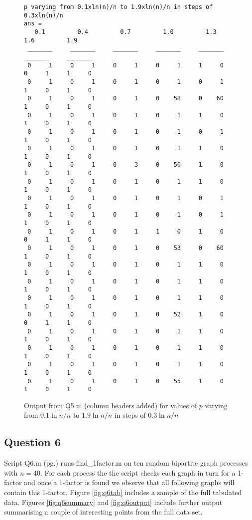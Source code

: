 \documentclass[a4paper]{article}
\begin{document}
\begin{figure}[H]
    \centering
    \begin{verbatim}
p varying from 0.1xln(n)/n to 1.9xln(n)/n in steps of 0.3xln(n)/n
ans =
   0.1         0.4         0.7         1.0         1.3         1.6         1.9    
 _______     _______     _______     _______     _______     _______     _______
 0     1     0     1     0     1     0     1     1     0     0     1     1     0
 0     1     0     1     0     1     0     1     0     1     1     0     1     0
 0     1     0     1     0     1     0    58     0    60     1     0     1     0
 0     1     0     1     0     1     0     1     1     0     1     0     1     0
 0     1     0     1     0     1     0     1     0     1     1     0     1     0
 0     1     0     1     0     1     0     1     1     0     1     0     1     0
 0     1     0     1     0     3     0    50     1     0     1     0     1     0
 0     1     0     1     0     1     0     1     1     0     1     0     1     0
 0     1     0     1     0     1     0     1     0     1     1     0     1     0
 0     1     0     1     0     1     0     1     0     1     1     0     1     0
 0     1     0     1     0     1     1     0     1     0     0     1     1     0
 0     1     0     1     0     1     0    53     0    60     1     0     1     0
 0     1     0     1     0     1     0     1     1     0     1     0     1     0
 0     1     0     1     0     1     0     1     1     0     1     0     1     0
 0     1     0     1     0     1     0     1     1     0     1     0     1     0
 0     1     0     1     0     1     0    52     1     0     0     1     1     0
 0     1     0     1     0     1     0     1     1     0     1     0     1     0
 0     1     0     1     0     1     0     1     1     0     1     0     1     0
 0     1     0     1     0     1     0     1     1     0     1     0     1     0
 0     1     0     1     0     1     0    55     1     0     1     0     1     0
    \end{verbatim}
    \caption{Output from Q5.m (column headers added) for values of $p$ varying from $0.1\ln{n}/n$ to $1.9\ln{n}/n$ in steps of $0.3\ln{n}/n$}
    \label{fig:q5b}
\end{figure}

\subsection*{Question 6}

Script Q6.m (pg.\pageref{PQ6}) runs find\_1factor.m on ten random bipartite graph processes with $n=40$. For each process the the script checks each graph in turn for a 1-factor and once a 1-factor is found we observe that all following graphs will contain this 1-factor. Figure \ref{fig:q6tab} includes a sample of the full tabulated data. Figures \ref{fig:q6summary} and \ref{fig:q6output} include further output summarising a couple of interesting points from the full data set.
\end{document}
